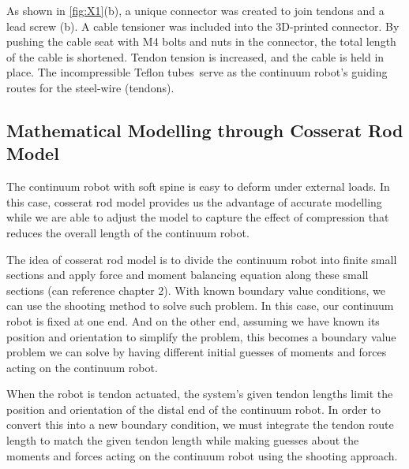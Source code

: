 As shown in \ref{fig:X1}(b), a unique connector was created to join tendons and a lead screw (b). A cable tensioner was included into the 3D-printed connector. By pushing the cable seat with M4 bolts and nuts in the connector, the total length of the cable is shortened. Tendon tension is increased, and the cable is held in place. The incompressible Teflon tubes serve as the continuum robot's guiding routes for the steel-wire (tendons). 


\subsection{Mathematical Modelling through Cosserat Rod Model}
The continuum robot with soft spine is easy to deform under external loads. In this case, cosserat rod model provides us the advantage of accurate modelling while we are able to adjust the model to capture the effect of compression that reduces the overall length of the continuum robot. 

The idea of cosserat rod model is to divide the continuum robot into finite small sections and apply force and moment balancing equation along these small sections (can reference chapter 2).  With known boundary value conditions, we can use the shooting method to solve such problem. In this case, our continuum robot is fixed at one end. And on the other end, assuming we have known its position and orientation to simplify the problem, this becomes a boundary value problem we can solve by having different initial guesses of moments and forces acting on the continuum robot. 

When the robot is tendon actuated, the system's given tendon lengths limit the position and orientation of the distal end of the continuum robot.  In order to convert this into a new boundary condition, we must integrate the tendon route length to match the given tendon length while making guesses about the moments and forces acting on the continuum robot using the shooting approach. 



